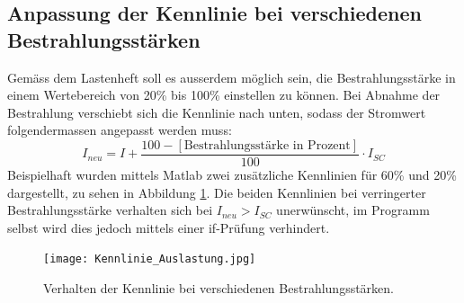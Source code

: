\subsection{Anpassung der Kennlinie bei verschiedenen Bestrahlungsstärken}
Gemäss dem Lastenheft soll es ausserdem möglich sein, die Bestrahlungsstärke in einem Wertebereich von 20\% bis 100\% einstellen zu können. Bei Abnahme der Bestrahlung verschiebt sich die Kennlinie nach unten, sodass der Stromwert folgendermassen angepasst werden muss:
\begin{equation}
	I_{neu}=I+\frac{100-\left[\text{Bestrahlungsstärke in Prozent}\right]}{100}\cdot I_{SC}
\label{eq:kennlinie_prozent}
\end{equation}
Beispielhaft wurden mittels Matlab zwei zusätzliche Kennlinien für 60\% und 20\% dargestellt, zu sehen in Abbildung \ref{fig:Kennlinie_Auslastung}. Die beiden Kennlinien bei verringerter Bestrahlungsstärke verhalten sich bei $I_{neu}>I_{SC}$ unerwünscht, im Programm selbst wird dies jedoch mittels einer if-Prüfung verhindert.
\begin{figure}
	\centering
		\texttt{[image: Kennlinie\_Auslastung.jpg]}
	\caption{Verhalten der Kennlinie bei verschiedenen Bestrahlungsstärken.}
	\label{fig:Kennlinie_Auslastung}
\end{figure}
